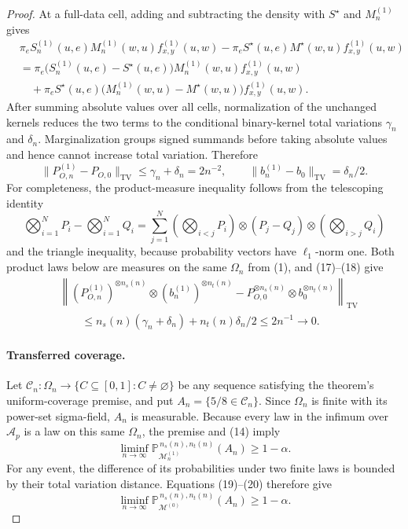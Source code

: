 \documentclass{article}
\begin{document}
\begin{proof}
At a full-data cell, adding and subtracting the density with \(S^{\star}\) and \(M^{(1)}_n\) gives
\[
\begin{aligned}
&\pi_eS^{(1)}_n(u,e)M^{(1)}_n(w,u)f^{(1)}_{x,y}(u,w)
-\pi_eS^{\star}(u,e)M^{\star}(w,u)f^{(1)}_{x,y}(u,w)\\
&=\pi_e\bigl(S^{(1)}_n(u,e)-S^{\star}(u,e)\bigr)
M^{(1)}_n(w,u)f^{(1)}_{x,y}(u,w)\\
&\quad+\pi_eS^{\star}(u,e)
\bigl(M^{(1)}_n(w,u)-M^{\star}(w,u)\bigr)
f^{(1)}_{x,y}(u,w).
\end{aligned}
\]
After summing absolute values over all cells, normalization of the unchanged kernels reduces the two terms to the conditional binary-kernel total variations \(\gamma_n\) and \(\delta_n\). Marginalization groups signed summands before taking absolute values and hence cannot increase total variation. Therefore
\[
\lVert P^{(1)}_{O,n}-P_{O,0}\rVert_{\mathrm{TV}}
\le\gamma_n+\delta_n=2n^{-2},
\qquad
\lVert b^{(1)}_n-b_0\rVert_{\mathrm{TV}}=\delta_n/2.
\tag{17}
\]
For completeness, the product-measure inequality follows from the telescoping identity
\[
\bigotimes_{i=1}^N P_i-\bigotimes_{i=1}^N Q_i
=\sum_{j=1}^N
\left(\bigotimes_{i<j}P_i\right)\otimes(P_j-Q_j)\otimes
\left(\bigotimes_{i>j}Q_i\right)
\tag{18}
\]
and the triangle inequality, because probability vectors have \(\ell_1\)-norm one. Both product laws below are measures on the same \(\Omega_n\) from (1), and (17)--(18) give
\[
\begin{aligned}
&\left\lVert
(P^{(1)}_{O,n})^{\otimes n_s(n)}\otimes(b^{(1)}_n)^{\otimes n_t(n)}
-P_{O,0}^{\otimes n_s(n)}\otimes b_0^{\otimes n_t(n)}
\right\rVert_{\mathrm{TV}}\\
&\qquad\le n_s(n)(\gamma_n+\delta_n)+n_t(n)\delta_n/2
\le2n^{-1}\longrightarrow0.
\end{aligned}
\tag{19}
\]

\paragraph{Transferred coverage.}
Let \(\mathcal C_n:\Omega_n\to\{C\subseteq[0,1]:C\ne\varnothing\}\) be any sequence satisfying the theorem's uniform-coverage premise, and put \(A_n=\{5/8\in\mathcal C_n\}\). Since \(\Omega_n\) is finite with its power-set sigma-field, \(A_n\) is measurable. Because every law in the infimum over \(\mathcal A_p\) is a law on this same \(\Omega_n\), the premise and (14) imply
\[
\liminf_{n\to\infty}
\mathbb P_{\mathcal M^{(1)}_n}^{\,n_s(n),n_t(n)}(A_n)
\ge1-\alpha.
\tag{20}
\]
For any event, the difference of its probabilities under two finite laws is bounded by their total variation distance. Equations (19)--(20) therefore give
\[
\liminf_{n\to\infty}
\mathbb P_{\mathcal M^{(0)}}^{\,n_s(n),n_t(n)}(A_n)
\ge1-\alpha.
\tag{21}
\]


\end{proof}
\end{document}
